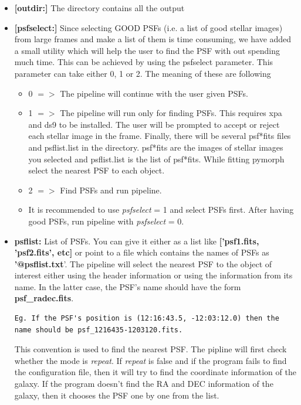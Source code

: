 \documentclass[a4paper,10pt]{article}
\newcommand{\red}[1]{{\color{red}[#1]}}
\begin{document}
\begin{itemize}
\item \textbf{\red{outdir:}} The directory contains all the output 

\item \textbf{\red{psfselect:}} Since selecting GOOD PSFs (i.e. a list of good stellar images) from large frames and make a list of them is time consuming, we have added a small utility which will help the user to find the PSF with out spending much time. This can be achieved by using the psfselect parameter. This parameter can take either 0, 1 or 2. The meaning of these are following
\begin{itemize}
\item 0 $=>$ The pipeline will continue with the user given PSFs.
\item 1 $=>$ The pipeline will run only for finding PSFs. This requires xpa and ds9 to be installed. The user will be prompted to accept or reject each stellar image in the frame. Finally, there will be several psf*fits files and psflist.list in the directory. psf*fits are the images of stellar images you selected and psflist.list is the list of psf*fits. While fitting pymorph select the nearest PSF to each object.
\item 2 $=>$ Find PSFs and run pipeline.
\item[] It is recommended to use \textit{psfselect} = 1 and select PSFs first. After having
 good PSFs, run pipeline with \textit{psfselect} = 0.
\end{itemize}

\item \textbf{psflist:} List of PSFs. You can give it either as a list like \textbf{['psf1.fits, 'psf2.fits', etc]} or point to a file which contains the names of PSFs as \textbf{'@psflist.txt}'. The pipeline will select the nearest PSF to the object of interest either using the header information or using the information from its name. In the latter case, the PSF's name should have the form \textbf{ psf\_radec.fits}.
\begin{verbatim}Eg. If the PSF's position is (12:16:43.5, -12:03:12.0) then the 
name should be psf_1216435-1203120.fits.
\end{verbatim}
This convention is used to find the nearest PSF. The pipline will first check whether the mode is \textit{repeat}. If \textit{repeat} is false and if the program fails to find the configuration file, then it will try to find the coordinate information of the galaxy. If the program doesn't find the RA and DEC information of the galaxy, then it chooses the PSF one by one from the list.


\end{itemize}
\end{document}
